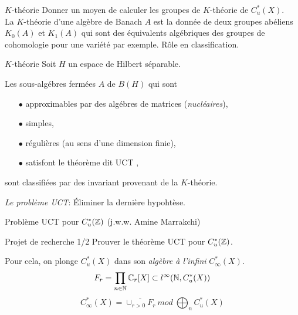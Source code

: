 \begin{frame}{$K$-th\'eorie}
Donner un moyen de calculer les groupes de $K$-th\'eorie de $C^*_u(X)$.\\
\vfill
La $K$-th\'eorie d'une alg\`ebre de Banach $A$ est la donn\'ee de deux groupes ab\'eliens $K_0(A)$ et $K_1(A)$ qui sont des \'equivalents alg\'ebriques des groupes de cohomologie pour une vari\'et\'e par exemple.  
\vfill
R\^{o}le en classification.\\
\vfill

\end{frame}

\begin{frame}{$K$-th\'eorie}
Soit $H$ un espace de Hilbert s\'eparable.
\vfill
\begin{theorem}
Les sous-alg\'ebres ferm\'ees $A$ de $B(H)$ qui sont
\begin{itemize}
\item[$\bullet$] approximables par des alg\'ebres de matrices (\textit{nucl\'eaires}),
\item[$\bullet$] simples,
\item[$\bullet$] r\'eguli\`eres (au sens d'une dimension finie),
\item[$\bullet$] satisfont le th\'eor\`eme dit UCT ,
\end{itemize}
sont classifi\'ees par des invariant provenant de la $K$-th\'eorie.
\end{theorem} 
\vfill
\textit{Le probl\`eme UCT}: \'Eliminer la derni\`ere hypoht\`ese.
\end{frame}

\begin{frame}{Probl\`eme UCT pour $C^*_u(\mathbb Z)$ (j.w.w. Amine Marrakchi)}
\begin{block}{Projet de recherche 1/2}
Prouver le th\'eor\`eme UCT pour $C^*_u(\mathbb Z)$.
\end{block}
\vfill
Pour cela, on plonge $C^*_u(X)$ dans son \textit{alg\`ebre \`a l'infini} $C^*_\infty(X)$.
\[ F_r = \prod_{n\in \mathbb N} \mathbb C_r[X] \subset l^\infty(\mathbb N , C^*_u(X))\]
\[C^*_\infty(X) = \overline{\cup_{r>0 } F_r} \ mod \ \bigoplus_n C^*_u(X)\]
\end{frame}

